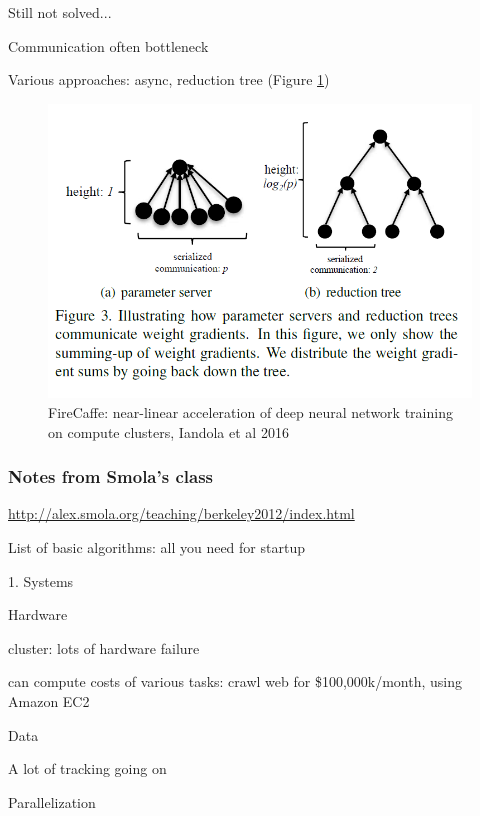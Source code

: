 \documentclass[english]{article}
\begin{document}
\item {Still not solved...}
\bitem
\item Communication often bottleneck
\item Various approaches: async, reduction tree (Figure \ref{FireCaffe})
\eitem
\begin{figure}
\begin{center}
\includegraphics[width=0.4\paperwidth]{fc}
\end{center}
\caption{FireCaffe: near-linear acceleration of deep neural network training
on compute clusters, Iandola et al 2016}
    \label{FireCaffe}
\end{figure}
\eenum

\subsubsection{Notes from Smola's class}


\url{http://alex.smola.org/teaching/berkeley2012/index.html}

List of basic algorithms: all you need for startup

\benum 
\item  1. Systems
\benum 
\item   Hardware 
       
 cluster: lots of hardware failure

 can compute costs of various tasks: crawl web for \$100,000k/month, using Amazon EC2

\item   Data
 
A lot of tracking going on

\item  Parallelization
\end{document}

